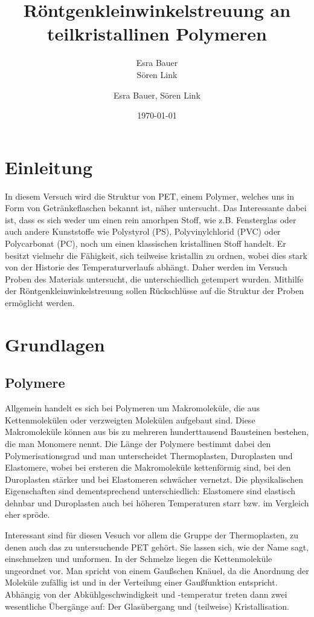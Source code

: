 \documentclass[bigchapter,colorback,accentcolor=tud4b,linedtoc,11pt]{tudreport}
\title{Röntgenkleinwinkelstreuung an teilkristallinen Polymeren}
\subtitle{Esra Bauer  \\Sören Link}
\author{Esra Bauer, Sören Link}
\date{\today}
\begin{document}

\maketitle

\tableofcontents


\chapter{Einleitung}

In diesem Versuch wird die Struktur von PET, einem Polymer, welches uns in Form von Getränkeflaschen bekannt ist, näher untersucht. Das Interessante dabei ist, dass es sich weder um einen rein amorhpen Stoff, wie z.B. Fensterglas oder auch andere Kunststoffe wie  Polystyrol (PS), Polyvinylchlorid (PVC) oder Polycarbonat (PC), noch um einen klassischen kristallinen Stoff handelt. Er besitzt vielmehr die Fähigkeit, sich teilweise kristallin zu ordnen, wobei dies stark von der Historie des Temperaturverlaufs abhängt. Daher werden im Versuch Proben des Materials untersucht, die unterschiedlich getempert wurden. Mithilfe der Röntgenkleinwinkelstreuung sollen Rückschlüsse auf die Struktur der Proben ermöglicht werden.

\chapter{Grundlagen}
\section{Polymere}

Allgemein handelt es sich bei Polymeren um Makromoleküle, die aus Kettenmolekülen oder verzweigten Molekülen aufgebaut sind. Diese Makromoleküle können aus bis zu mehreren hunderttausend Bausteinen bestehen, die man Monomere nennt. Die Länge der Polymere bestimmt dabei den Polymerisationsgrad und man unterscheidet Thermoplasten, Duroplasten und Elastomere, wobei bei ersteren die Makromoleküle kettenförmig sind, bei den Duroplasten stärker und bei Elastomeren schwächer vernetzt. Die physikalischen Eigenschaften sind dementsprechend unterschiedlich: Elastomere sind elastisch dehnbar und Duroplasten auch bei höheren Temperaturen starr bzw. im Vergleich eher spröde. 

Interessant sind für diesen Vesuch vor allem die Gruppe der Thermoplasten, zu denen auch das zu untersuchende PET gehört. Sie lassen sich, wie der Name sagt, einschmelzen und umformen. In der Schmelze liegen die Kettenmoleküle ungeordnet vor. Man spricht von einem Gaußschen Knäuel, da die Anordnung der Moleküle zufällig ist und in der Verteilung einer Gaußfunktion entspricht. Abhängig von der Abkühlgeschwindigkeit und -temperatur treten dann zwei wesentliche Übergänge auf: Der Glasübergang und (teilweise) Kristallisation.
\end{document}
